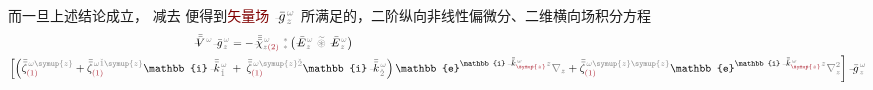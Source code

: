 而一旦上述结论成立， 减去  便得到\textcolor{Maroon}{矢量场} $\Xint{{}^{}_{\mathcolor{gray}{-}}}{10}{\bar{g}}^{\;\!\mathcolor{gray}{\omega}}_{\;\! \mathcolor{gray}{z}}$ 所满足的，二阶纵向非线性偏微分、二维横向场积分方程
\begin{subequations}
\begin{align}
	\Xint{\mathcolor{gray}{-}}{25}{\bar{\bar{V}}}^{\;\! \mathcolor{gray}{\omega}} \Xint{{}^{}_{\mathcolor{gray}{-}}}{10}{\bar{g}}^{\;\!\mathcolor{gray}{\omega}}_{\;\! \mathcolor{gray}{z}}
	&= - \Xint{{}^{}_{\mathcolor{gray}{-}}}{23}{\bar{\bar{\bar{\chi}}}}^{\;\! \mathcolor{gray}{\omega}}_{\mathcolor{gray}{z} \textcolor{Maroon}{(2)}} ~{}^{\mathcolor{gray}{*}}_{\mathcolor{gray}{*}} \left( \Xint{\mathcolor{gray}{-}}{295}{\bar{E}}^{\;\!\mathcolor{gray}{\omega}}_{\;\! \mathcolor{gray}{z}} ~\mathcolor{gray}{\widetilde \circledast}~ \Xint{\mathcolor{gray}{-}}{295}{\bar{E}}^{\;\!\mathcolor{gray}{\omega}}_{\;\! \mathcolor{gray}{z}} \right)  \label{eq:nonlinear(2)-wave_wkrho-simplify6-V} \\
	\left[ \left( \bar{\bar{\zeta}}^{\;\! \mathcolor{gray}{\omega} \mathcolor{gray}{\symup{z}}}_{\textcolor{Maroon}{(1)}} + \bar{\bar{\zeta}}^{\;\! \mathcolor{gray}{\omega} \mathcolor{gray}{\check{1} \symup{z}}}_{\textcolor{Maroon}{(1)}} \mathbb{i} \Xint{\begin{smallmatrix} ~ \\ {}^{}_{\mathcolor{gray}{-}} \\ ~ \end{smallmatrix}}{15}{\bar{\bar{k}}}_{\;\! \mathcolor{gray}{\check{1}}}^{\;\! \mathcolor{gray}{\omega}} \right.\right.&+\left.\left. \bar{\bar{\zeta}}^{\;\! \mathcolor{gray}{\omega} \mathcolor{gray}{\symup{z} \check{2}}}_{\textcolor{Maroon}{(1)}} \mathbb{i} \Xint{\begin{smallmatrix} ~ \\ {}^{}_{\mathcolor{gray}{-}} \\ ~ \end{smallmatrix}}{15}{\bar{\bar{k}}}_{\;\! \mathcolor{gray}{\check{2}}}^{\;\! \mathcolor{gray}{\omega}} \right) \mathbb{e}^{\mathbb{i} \Xint{\begin{smallmatrix} ~ \\ {}^{}_{\mathcolor{gray}{-}} \\ ~ \end{smallmatrix}}{15}{\bar{\bar{k}}}_{\textcolor{Maroon}{\symup{z}}}^{\;\! \mathcolor{gray}{\omega}} \mathcolor{gray}{z}} \mathcolor{gray}{\nabla_z} + \bar{\bar{\zeta}}^{\;\! \mathcolor{gray}{\omega} \mathcolor{gray}{\symup{z} \symup{z}}}_{\textcolor{Maroon}{(1)}} \mathbb{e}^{\mathbb{i} \Xint{\begin{smallmatrix} ~ \\ {}^{}_{\mathcolor{gray}{-}} \\ ~ \end{smallmatrix}}{15}{\bar{\bar{k}}}_{\textcolor{Maroon}{\symup{z}}}^{\;\! \mathcolor{gray}{\omega}} \mathcolor{gray}{z}} \mathcolor{gray}{\nabla_z^2} \right] \Xint{{}^{}_{\mathcolor{gray}{-}}}{10}{\bar{g}}^{\;\!\mathcolor{gray}{\omega}}_{\;\! \mathcolor{gray}{z}} \label{eq:nonlinear(2)-wave_wkrho-simplify6-V2} \\

\end{align}
\end{subequations}
